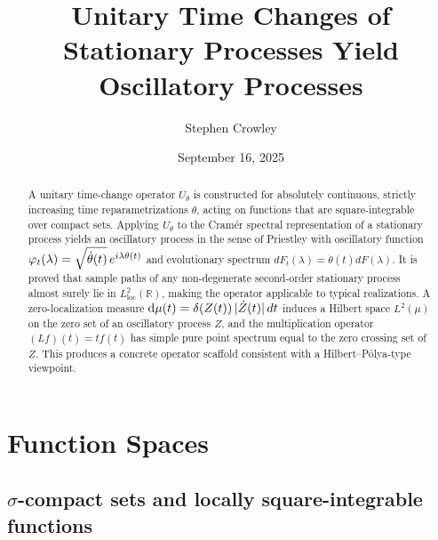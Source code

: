 \documentclass{article}
\newcommand{\mathd}{\mathrm{d}}
\newcommand{\tmop}[1]{\ensuremath{\operatorname{#1}}}
\begin{document}
\title{
  Unitary Time Changes of Stationary Processes Yield Oscillatory Processes\\
  
}

\author{Stephen Crowley}

\date{September 16, 2025}

\maketitle

\begin{abstract}
  A unitary time-change operator $U_{\theta}$ is constructed for absolutely
  continuous, strictly increasing time reparametrizations $\theta$, acting on
  functions that are square-integrable over compact sets. Applying
  $U_{\theta}$ to the Cram{\'e}r spectral representation of a stationary
  process yields an oscillatory process in the sense of Priestley with
  oscillatory function $\varphi_t (\lambda) = \sqrt{\dot{\theta} (t)} 
  \hspace{0.17em} e^{i \lambda \theta (t)}$ and evolutionary spectrum $dF_t
  (\lambda) = \dot{\theta} (t) dF (\lambda)$. It is proved that sample paths
  of any non-degenerate second-order stationary process almost surely lie in
  $L^2_{\tmop{loc}} (\mathbb{R})$, making the operator applicable to typical
  realizations. A zero-localization measure $\mathd \mu (t) = \delta (Z (t))
  \hspace{0.17em} | \dot{Z} (t) |  \hspace{0.17em} dt$ induces a Hilbert space
  $L^2 (\mu)$ on the zero set of an oscillatory process $Z$, and the
  multiplication operator $(Lf) (t) = tf (t)$ has simple pure point spectrum
  equal to the zero crossing set of $Z$. This produces a concrete operator
  scaffold consistent with a Hilbert--P{\'o}lya-type viewpoint.
\end{abstract}

{\tableofcontents}

\section{Function Spaces}\label{sec:functionspaces}

\subsection{$\sigma$-compact sets and locally square-integrable functions}
\end{document}
